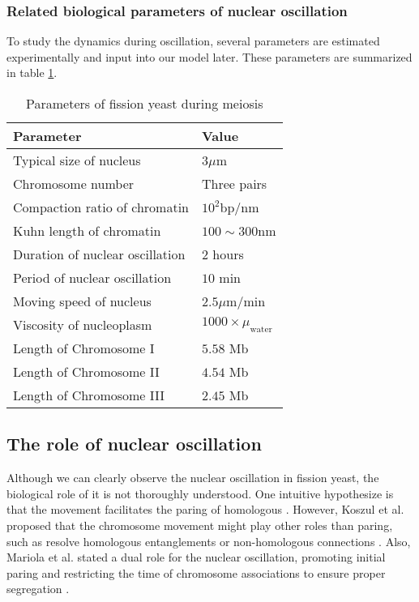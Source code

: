 \subsubsection{Related biological parameters of nuclear oscillation}
To study the dynamics during oscillation, several parameters are estimated experimentally and input into our model later. These parameters are summarized in table \ref{tab:parameters}.

\begin{table}[htpb]
    \centering
    \caption{Parameters of fission yeast during meiosis}
    \label{tab:parameters}
    \begin{tabular}{l|l}
        \hline
        \textbf{Parameter} & \textbf{Value} \\
        \hline
        Typical size of nucleus          &  $3\mu$m \\
        Chromosome number                &  Three pairs \\
        Compaction ratio of chromatin    &  $10^2$bp/nm \\
        Kuhn length of chromatin         &  $100\sim300$nm  \\
        Duration of nuclear oscillation  &  $2$ hours  \\
        Period of nuclear oscillation    &  $10$ min  \\
        Moving speed of nucleus          &  $2.5\mu$m/min \\
        Viscosity of nucleoplasm         &  $1000\times \mu_{\text{water}}$ \\
        Length of Chromosome I           & $5.58$ Mb  \\
        Length of Chromosome II          & $4.54$ Mb  \\
        Length of Chromosome III         & $2.45$ Mb  \\
        \hline
    \end{tabular}
\end{table}


\subsection{The role of nuclear oscillation}
\label{sub:the_role_of_nuclear_oscillation}

Although we can clearly observe the nuclear oscillation in fission yeast, the biological role of it is not thoroughly understood. One intuitive hypothesize is that the movement facilitates the paring of homologous \cite{Ding2004}. However, Koszul et al. proposed that the chromosome movement might play other roles than paring, such as resolve homologous entanglements or non-homologous connections \cite{Koszul2009a}. Also, Mariola et al. stated a dual role for the nuclear oscillation, promoting initial paring and restricting the time of chromosome associations to ensure proper segregation \cite{Chacon2016}. 

